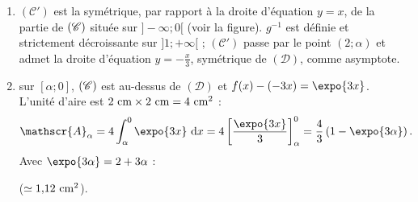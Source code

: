 \begin{enumerate}
\begin{enumerate}
				 ($\simeq -0{,}40$).
			\item {}
				$(\mathscr{C}')$ est la symétrique, par rapport à la droite d'équation $y = x$, de la partie de $(\mathscr{C})$ située
				sur $]-\infty;0[$ (voir la figure). $g^{-1}$ est définie et strictement décroissante sur $]1;+\infty[$ ;
				$(\mathscr{C}')$ passe par le point $(2;\alpha)$ et admet la droite d'équation $y = -\frac{x}{3}$, symétrique de $(\mathscr{D})$, comme asymptote.
			\item {}
				sur $[\alpha;0]$, $(\mathscr{C})$ est au-dessus de $(\mathscr{D})$ et $f(x) - (-3x) = \expo{3x}$.
				L'unité d'aire est $2~\mathrm{cm}\times2~\mathrm{cm} = 4~\mathrm{cm}^2$ :
				\[
					\mathscr{A}_\alpha = 4\int_\alpha^0 \expo{3x}\dx = 4\left[\frac{\expo{3x}}{3}\right]_\alpha^0 = \frac{4}{3}\left(1 - \expo{3\alpha}\right).
				\]
				Avec $\expo{3\alpha} = 2 + 3\alpha$ :

				 ($\simeq 1{,}12~\mathrm{cm}^2$).
		\end{enumerate}
	\end{enumerate}
